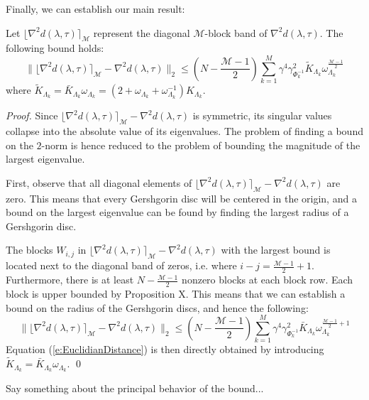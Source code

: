 Finally, we can establish our main result:
\begin{lemma} \label{l:EuclidianDistance}
Let $ \lfloor \nabla^2 d(\lambda, \tau) \rceil_{\mathcal{M}}$ represent the diagonal $\mathcal{M}$-block band of $\nabla^2 d(\lambda, \tau)$. The following bound holds:
\begin{equation} \label{e:EuclidianDistance}
\| \lfloor \nabla^2 d(\lambda, \tau) \rceil_{\mathcal{M}} - \nabla^2 d(\lambda, \tau) \|_2 \leq (N -\frac{\mathcal{M} - 1}{2}) \sum_{k=1}^M \gamma^4 \gamma_{\Phi_k^{-1}}^2 \tilde{K}_{\Lambda_k} \omega_{\Lambda_k}^{\frac{\mathcal{M} - 1}{2}}
\end{equation}
where $\tilde{K}_{\Lambda_k} = \bar{K}_{\Lambda_k} \omega_{\Lambda_k} =  (2 + \omega_{\Lambda_k} + \omega_{\Lambda_k}^{-1}) K_{\Lambda_k}$.
\end{lemma}
\begin{proof}
Since $\lfloor \nabla^2 d(\lambda, \tau) \rceil_{\mathcal{M}} - \nabla^2 d(\lambda, \tau)$ is symmetric, its singular values collapse into the absolute value of its eigenvalues. The problem of finding a bound on the $2$-norm is hence reduced to the problem of bounding the magnitude of the largest eigenvalue.

First, observe that all diagonal elements of $\lfloor \nabla^2 d(\lambda, \tau) \rceil_{\mathcal{M}} - \nabla^2 d(\lambda, \tau)$ are zero. This means that every Gershgorin disc will be centered in the origin, and a bound on the largest eigenvalue can be found by finding the largest radius of a Gershgorin disc.

The blocks $W_{i,j}$ in $\lfloor \nabla^2 d(\lambda, \tau) \rceil_{\mathcal{M}} - \nabla^2 d(\lambda, \tau)$ with the largest bound is located next to the diagonal band of zeros, i.e. where $i - j = \frac{\mathcal{M} - 1}{2} + 1$. Furthermore, there is at least $N -\frac{\mathcal{M} - 1}{2}$ nonzero blocks at each block row. Each block is upper bounded by Proposition X. This means that we can establish a bound on the radius of the Gershgorin discs, and hence the following:
\begin{equation}
\| \lfloor \nabla^2 d(\lambda, \tau) \rceil_{\mathcal{M}} - \nabla^2 d(\lambda, \tau) \|_2 \leq (N -\frac{\mathcal{M} - 1}{2}) \sum_{k=1}^M \gamma^4 \gamma_{\Phi_k^{-1}}^2 \bar{K}_{\Lambda_k} \omega_{\Lambda_k}^{\frac{\mathcal{M} - 1}{2} + 1}
\end{equation}
Equation (\ref{e:EuclidianDistance}) is then directly obtained by introducing $\tilde{K}_{\Lambda_k} = \bar{K}_{\Lambda_k} \omega_{\Lambda_k}$.
\qed
\end{proof}
Say something about the principal behavior of the bound...

